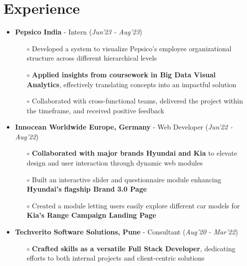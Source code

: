 \documentclass[10.8pt, a4paper]{extarticle}
\newcommand{\shorterSection}[1]{\vspace{-10pt}\section{#1}}
\begin{document}
\shorterSection{Experience}
\vspace{-2pt}
\begin{itemize}
    \item \textbf{Pepsico India} - Intern
    \hfill\hfill(\textit{Jun'23 - Aug'23})
    \begin{itemize}
          \item[$\circ$] Developed a system to visualize Pepsico's employee organizational structure across different hierarchical levels\\[-0.6cm]
          \item[$\circ$] \textbf{Applied insights from coursework in Big Data Visual Analytics}, effectively translating concepts into an impactful solution\\[-0.6cm]
          \item[$\circ$] Collaborated with cross-functional teams, delivered the project within the timeframe, and received positive feedback\\[-0.6cm]
    \end{itemize}
    \vspace{0.055cm}
    \item \textbf{Innocean Worldwide Europe, Germany} - Web Developer
    \hfill\hfill(\textit{Jun'22 - Aug'22})
    \begin{itemize}
          \item[$\circ$] \textbf{Collaborated with major brands Hyundai and Kia} to elevate design and user interaction through dynamic web modules \\[-0.6cm]
          \item[$\circ$] Built an interactive slider and questionnaire module enhancing \textbf{Hyundai's flagship Brand 3.0 Page}\\[-0.6cm]
          \item[$\circ$] Created a module letting users easily explore different car models for \textbf{Kia's Range Campaign Landing Page}\\[-0.6cm]
    \end{itemize}
    \vspace{0.055cm}
    \item \textbf{Techverito Software Solutions, Pune} - Consultant
    \hfill\hfill(\textit{Aug'20 - Mar'22})
    \begin{itemize}
          \item[$\circ$] \textbf{Crafted skills as a versatile Full Stack Developer}, dedicating efforts to both internal projects and client-centric solutions \\[-0.6cm]

\end{itemize}
\end{itemize}
\end{document}
